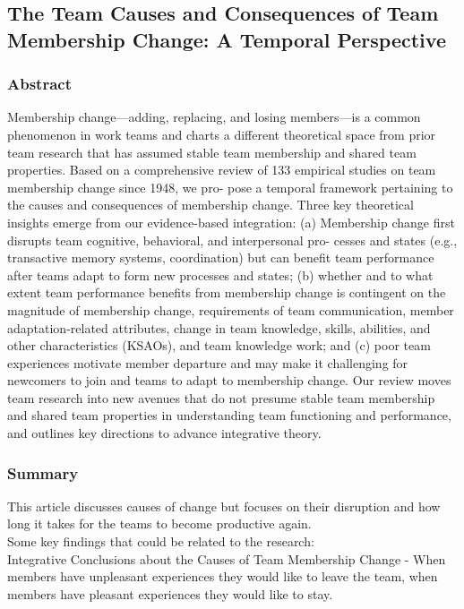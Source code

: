 \documentclass[12pt]{article}
\begin{document}
\subsection*{The Team Causes and Consequences of Team Membership Change: A Temporal Perspective\cite{team_causes}}

\subsubsection*{Abstract}

Membership change—adding, replacing, and losing members—is a common phenomenon in work teams and charts a different theoretical space from prior team research that has assumed stable team membership and shared team properties. Based on a comprehensive review of 133 empirical studies on team membership change since 1948, we pro- pose a temporal framework pertaining to the causes and consequences of membership change. Three key theoretical insights emerge from our evidence-based integration: (a) Membership change first disrupts team cognitive, behavioral, and interpersonal pro- cesses and states (e.g., transactive memory systems, coordination) but can benefit team performance after teams adapt to form new processes and states; (b) whether and to what extent team performance benefits from membership change is contingent on the magnitude of membership change, requirements of team communication, member adaptation-related attributes, change in team knowledge, skills, abilities, and other characteristics (KSAOs), and team knowledge work; and (c) poor team experiences motivate member departure and may make it challenging for newcomers to join and teams to adapt to membership change. Our review moves team research into new avenues that do not presume stable team membership and shared team properties in understanding team functioning and performance, and outlines key directions to advance integrative theory.


\subsubsection*{Summary}

This article discusses causes of change but focuses on their disruption and how long it takes for the teams to become productive again. \\

Some key findings that could be related to the research: \\

Integrative Conclusions about the Causes of Team Membership Change - When members have unpleasant experiences they would like to leave the team, when members have pleasant experiences they would like to stay. \\
\end{document}
